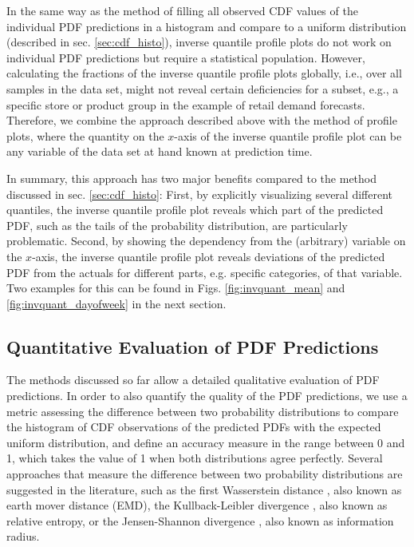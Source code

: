 \documentclass[BCOR=1mm, DIV=calc,10pt,
twoside=true,
twocolumn,
headings=normal]{scrartcl}
\begin{document}
In the same way as the method of filling all observed CDF values of the individual PDF predictions in a histogram and compare to a uniform distribution (described in sec. \ref{sec:cdf_histo}), inverse quantile profile plots do not work on individual PDF predictions but require a statistical population. However, calculating the fractions of the inverse quantile profile plots globally, i.e., over all samples in the data set, might not reveal certain deficiencies for a subset, e.g., a specific store or product group in the example of retail demand forecasts. Therefore, we combine the approach described above with the method of profile plots, where the quantity on the $x$-axis of the inverse quantile profile plot can be any variable of the data set at hand known at prediction time.

In summary, this approach has two major benefits compared to the method discussed in sec. \ref{sec:cdf_histo}: First, by explicitly visualizing several different quantiles, the inverse quantile profile plot reveals which part of the predicted PDF, such as the tails of the probability distribution, are particularly problematic. Second, by showing the dependency from the (arbitrary) variable on the $x$-axis, the inverse quantile profile plot reveals deviations of the predicted PDF from the actuals for different parts, e.g. specific categories, of that variable. Two examples for this can be found in Figs. \ref{fig:invquant_mean} and \ref{fig:invquant_dayofweek} in the next section.

\subsection{Quantitative Evaluation of PDF Predictions}
\label{sec:cdf_acc}

The methods discussed so far allow a detailed qualitative evaluation of PDF predictions. In order to also quantify the quality of the PDF predictions, we use a metric assessing the difference between two probability distributions to compare the histogram of CDF observations of the predicted PDFs with the expected uniform distribution, and define an accuracy measure in the range between 0 and 1, which takes the value of 1 when both distributions agree perfectly. Several approaches that measure the difference between two probability distributions are suggested in the literature, such as the first Wasserstein distance \cite{olkin1982}, also known as earth mover distance (EMD), the Kullback-Leibler divergence \cite{kullback1951}, also known as relative entropy, or the Jensen-Shannon divergence \cite{dagan1997}, also known as information radius.
\end{document}
